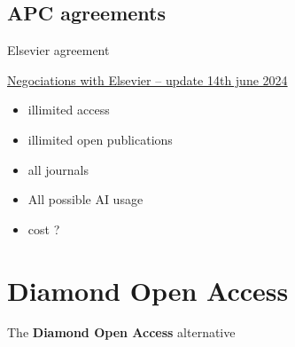 \documentclass[10pt,compress,serif,aspectratio=169]{beamer}
\begin{document}

\subsection{APC agreements}
\begin{frame}[t]{Elsevier agreement}

\href{https://www.swissuniversities.ch/fr/themes/open-science/negociations-avec-les-editeurs/elsevier}{Negociations with Elsevier -- update 14th june 2024}
\begin{itemize}
  \item illimited access
  \item illimited open publications
  \item all journals
  \item All possible AI usage
  \item cost ?
\end{itemize}
\end{frame}




\section{Diamond Open Access}

 \begin{frame}[t]
  \begin{center}
  \vspace{3cm}
  {\huge The \textbf{Diamond Open Access} alternative}\\
  \end{center}
\end{frame}

\end{document}
